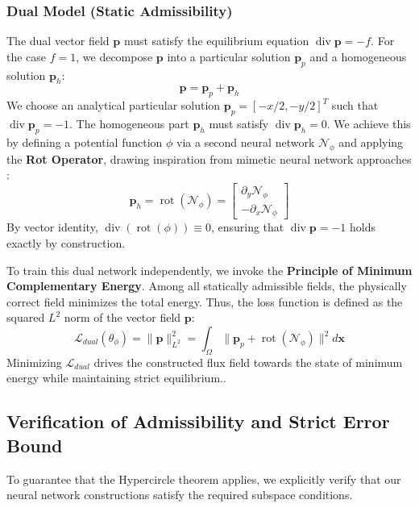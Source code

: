 \documentclass[12pt, a4paper]{article}
\DeclareMathOperator{\rot}{rot}
\DeclareMathOperator{\divg}{div}
\begin{document}
\subsubsection{Dual Model (Static Admissibility)}
The dual vector field $\mathbf{p}$ must satisfy the equilibrium equation $\divg \mathbf{p} = -f$. For the case $f=1$, we decompose $\mathbf{p}$ into a particular solution $\mathbf{p}_p$ and a homogeneous solution $\mathbf{p}_h$:
\begin{equation}
    \mathbf{p} = \mathbf{p}_p + \mathbf{p}_h
\end{equation}
We choose an analytical particular solution $\mathbf{p}_p = [-x/2, -y/2]^T$ such that $\divg \mathbf{p}_p = -1$.
The homogeneous part $\mathbf{p}_h$ must satisfy $\divg \mathbf{p}_h = 0$. We achieve this by defining a potential function $\phi$ via a second neural network $\mathcal{N}_\phi$ and applying the \textbf{Rot Operator}, drawing inspiration from mimetic neural network approaches \cite{lyu2022mim}:
\begin{equation}
    \mathbf{p}_h = \rot(\mathcal{N}_\phi) = \begin{bmatrix} \partial_y \mathcal{N}_\phi \\ -\partial_x \mathcal{N}_\phi \end{bmatrix}
\end{equation}
By vector identity, $\divg(\rot(\phi)) \equiv 0$, ensuring that $\divg \mathbf{p} = -1$ holds exactly by construction.

To train this dual network independently, we invoke the \textbf{Principle of Minimum Complementary Energy}. Among all statically admissible fields, the physically correct field minimizes the total energy. Thus, the loss function is defined as the squared $L^2$ norm of the vector field $\mathbf{p}$:
\begin{equation} \label{eq:dual_loss}
    \mathcal{L}_{dual}(\theta_\phi) = \| \mathbf{p} \|^2_{L^2} = \int_{\Omega} \| \mathbf{p}_p + \rot(\mathcal{N}_\phi) \|^2 d\mathbf{x}
\end{equation}
Minimizing $\mathcal{L}_{dual}$ drives the constructed flux field towards the state of minimum energy while maintaining strict equilibrium..

\subsection{Verification of Admissibility and Strict Error Bound}
To guarantee that the Hypercircle theorem applies, we explicitly verify that our neural network constructions satisfy the required subspace conditions.
\end{document}
